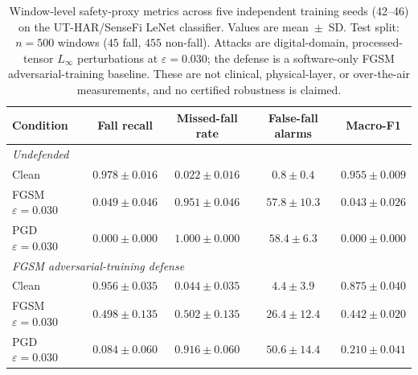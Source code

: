 
\begin{table}[t]
  \centering
  \caption[Multi-seed adversarial safety-proxy robustness (UT-HAR/SenseFi LeNet)]{%
    Window-level safety-proxy metrics across five independent training seeds
    (42--46) on the UT-HAR/SenseFi LeNet classifier. Values are mean~$\pm$~SD.
    Test split: $n=500$ windows ($45$ fall, $455$ non-fall). Attacks are
    digital-domain, processed-tensor $L_\infty$ perturbations at
    $\varepsilon=0.030$; the defense is a software-only FGSM
    adversarial-training baseline. These are not clinical, physical-layer, or
    over-the-air measurements, and no certified robustness is claimed.}
  \label{tab:multiseed-robustness}
  \begin{tabular}{l c c c c}
    \toprule
    Condition & Fall recall & Missed-fall rate & False-fall alarms & Macro-F1 \\
    \midrule
    \multicolumn{5}{l}{\emph{Undefended}}\\
    Clean              & $0.978 \pm 0.016$ & $0.022 \pm 0.016$ & $0.8 \pm 0.4$   & $0.955 \pm 0.009$ \\
    FGSM $\varepsilon{=}0.030$ & $0.049 \pm 0.046$ & $0.951 \pm 0.046$ & $57.8 \pm 10.3$ & $0.043 \pm 0.026$ \\
    PGD $\varepsilon{=}0.030$  & $0.000 \pm 0.000$ & $1.000 \pm 0.000$ & $58.4 \pm 6.3$  & $0.000 \pm 0.000$ \\
    \midrule
    \multicolumn{5}{l}{\emph{FGSM adversarial-training defense}}\\
    Clean              & $0.956 \pm 0.035$ & $0.044 \pm 0.035$ & $4.4 \pm 3.9$   & $0.875 \pm 0.040$ \\
    FGSM $\varepsilon{=}0.030$ & $0.498 \pm 0.135$ & $0.502 \pm 0.135$ & $26.4 \pm 12.4$ & $0.442 \pm 0.020$ \\
    PGD $\varepsilon{=}0.030$  & $0.084 \pm 0.060$ & $0.916 \pm 0.060$ & $50.6 \pm 14.4$ & $0.210 \pm 0.041$ \\
    \bottomrule
  \end{tabular}

  \vspace{0.6em}


\end{table}
